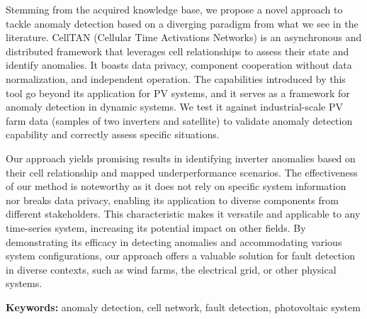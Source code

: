 Stemming from the acquired knowledge base, we propose a novel approach to tackle anomaly detection based on a diverging paradigm from what we see in the literature. CellTAN (Cellular Time Activations Networks) is an asynchronous and distributed framework that leverages cell relationships to assess their state and identify anomalies. It boasts data privacy, component cooperation without data normalization, and independent operation. The capabilities introduced by this tool go beyond its application for PV systems, and it serves as a framework for anomaly detection in dynamic systems. We test it against industrial-scale PV farm data (samples of two inverters and satellite) to validate anomaly detection capability and correctly assess specific situations.

Our approach yields promising results in identifying inverter anomalies based on their cell relationship and mapped underperformance scenarios. The effectiveness of our method is noteworthy as it does not rely on specific system information nor breaks data privacy, enabling its application to diverse components from different stakeholders. This characteristic makes it versatile and applicable to any time-series system, increasing its potential impact on other fields. By demonstrating its efficacy in detecting anomalies and accommodating various system configurations, our approach offers a valuable solution for fault detection in diverse contexts, such as wind farms, the electrical grid, or other physical systems.


\bigskip

\textbf{Keywords:} anomaly detection, cell network, fault detection, photovoltaic system
